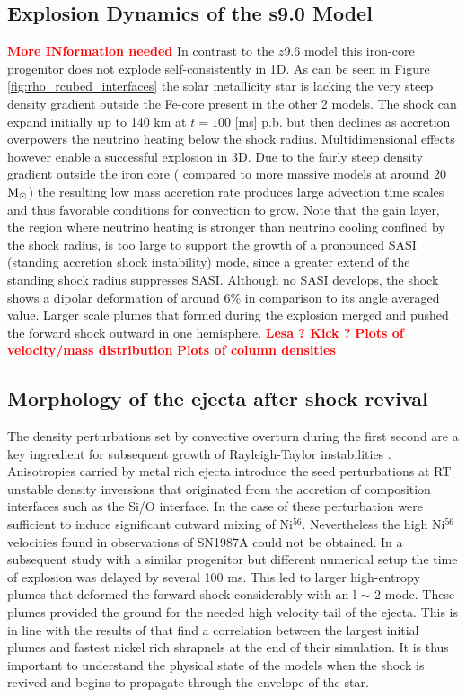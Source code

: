 \documentclass[fleqn,usenatbib]{mnras}
\newcommand{\nickel}{$\mathrm{Ni^{56}}$\xspace}
\newcommand{\solm}{\xspace\ensuremath{\rm{M_{\odot}}}}
\begin{document}
\subsection{Explosion Dynamics of the s9.0 Model}
\textcolor{red}{\textbf{More INformation needed}}
In contrast to the $z9.6$ model this iron-core progenitor does not explode self-consistently in 1D. As can be seen in Figure \ref{fig:rho_rcubed_interfaces} the solar metallicity star is lacking the very steep density gradient outside the Fe-core present in the other 2 models. The shock can expand initially up to 140 km at $t=100$ [ms] p.b. but then declines as accretion overpowers the neutrino heating below the shock radius. 
Multidimensional effects however enable a successful explosion in 3D.  Due to the fairly steep density gradient outside the iron core ( compared to more massive models at around 20\solm) the resulting low mass accretion rate produces large advection time scales and thus favorable conditions for convection to grow. Note that the gain layer, the region where neutrino heating is stronger than neutrino cooling confined by the shock radius,  is too large to support the growth of a pronounced SASI (standing accretion shock instability) mode, since a greater extend of the standing shock radius suppresses SASI. Although no SASI develops, the shock shows a dipolar deformation of around 6\% in comparison to its angle averaged value. Larger scale plumes that formed during the explosion merged and pushed the forward shock outward in one hemisphere. 
\textcolor{red}{\textbf{Lesa ? Kick ?}}
\textcolor{red}{\textbf{Plots of velocity/mass distribution}}
\textcolor{red}{\textbf{Plots of column densities}}

\subsection{Morphology of the ejecta after shock revival}
\label{subsec:Morphology of the ejecta after shock revival}

The density perturbations set by convective overturn during the first second are a key ingredient for subsequent growth of Rayleigh-Taylor instabilities \cite{Kifonidis2003}. Anisotropies carried by metal rich ejecta introduce the seed perturbations at RT unstable density inversions that originated from the accretion of composition interfaces such as the Si/O interface. In the case of \citet{Kifonidis2003} these perturbation were sufficient to induce significant outward mixing of \nickel. Nevertheless the high \nickel velocities found in observations of SN1987A could not be obtained. In a subsequent study with a similar progenitor but different numerical setup the time of explosion was delayed by several 100 ms. This led to larger high-entropy plumes that deformed the forward-shock considerably with an l $\sim$ 2 mode. These plumes provided the ground for the needed high velocity tail of the ejecta. This is in line with the results of \citet{Wongwathanarat2015} that find a correlation between the largest initial plumes and fastest nickel rich shrapnels at the end of their simulation. It is thus important to understand the physical state of the models when the shock is revived and begins to propagate through the envelope of the star.
\end{document}
